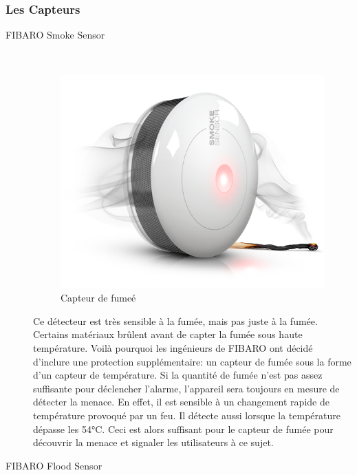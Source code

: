 \subsubsection{Les Capteurs}

\begin{description}
\item[FIBARO Smoke Sensor] \hfill \\

\begin{figure}[h!]
	\center
	\includegraphics[scale=0.4]{./Images/png/smoke.png}
	\caption{Capteur de fumeé}
\end{figure}

Ce détecteur est très sensible à la fumée, mais pas juste à la fumée. Certains matériaux brûlent avant de capter la fumée sous haute température.
Voilà pourquoi les ingénieurs de  FIBARO ont décidé d'inclure une protection supplémentaire: un capteur de fumée sous la forme d'un capteur de température.
 Si la quantité de fumée n'est pas assez suffisante pour déclencher l'alarme, l'appareil sera toujours en mesure de détecter la menace.
En effet, il est sensible à un changement rapide de température provoqué par un feu. Il détecte aussi lorsque la température dépasse les 54°C. Ceci est alors suffisant pour le capteur de fumée pour découvrir la menace et signaler les utilisateurs à ce sujet. 

\clearpage
\newpage
\item[FIBARO Flood Sensor] \hfill \\


\end{description}
